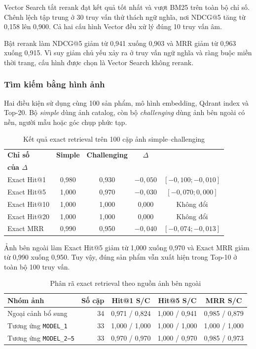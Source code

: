 Vector Search tắt rerank đạt kết quả tốt nhất và vượt BM25 trên toàn bộ chỉ số. Chênh lệch tập trung ở 30 truy vấn thử thách ngữ nghĩa, nơi NDCG@5 tăng từ 0,158 lên 0,900. Cả hai cấu hình Vector đều xử lý đúng 10 truy vấn âm.

Bật rerank làm NDCG@5 giảm từ 0,941 xuống 0,903 và MRR giảm từ 0,963 xuống 0,915. Vì suy giảm chủ yếu xảy ra ở truy vấn ngữ nghĩa và ràng buộc miền thời trang, cấu hình được chọn là Vector Search không rerank.

\subsubsection{Tìm kiếm bằng hình ảnh}

Hai điều kiện sử dụng cùng 100 sản phẩm, mô hình embedding, Qdrant index và Top-20. Bộ \textit{simple} dùng ảnh catalog, còn bộ \textit{challenging} dùng ảnh bên ngoài có nền, người mẫu hoặc góc chụp phức tạp.
\begin{table}[H]
\centering
\caption{Kết quả exact retrieval trên 100 cặp ảnh simple--challenging}
\label{tab:image-paired-exact-results}
\small
\begin{tabularx}{\linewidth}{|X|c|c|c|c|}
\hline
\textbf{Chỉ số} & \textbf{Simple} & \textbf{Challenging} & \textbf{$\Delta$} & \makecell{\textbf{CI 95\%}\\\textbf{của $\Delta$}} \\ \hline
Exact Hit@1 & 0,980 & 0,930 & $-0{,}050$ & $[-0{,}100; -0{,}010]$ \\ \hline
Exact Hit@5 & 1,000 & 0,970 & $-0{,}030$ & $[-0{,}070; 0{,}000]$ \\ \hline
Exact Hit@10 & 1,000 & 1,000 & 0,000 & Không đổi \\ \hline
Exact Hit@20 & 1,000 & 1,000 & 0,000 & Không đổi \\ \hline
Exact MRR & 0,990 & 0,950 & $-0{,}040$ & $[-0{,}074; -0{,}013]$ \\ \hline
\end{tabularx}
\end{table}

Ảnh bên ngoài làm Exact Hit@5 giảm từ 1,000 xuống 0,970 và Exact MRR giảm từ 0,990 xuống 0,950. Tuy vậy, đúng sản phẩm vẫn xuất hiện trong Top-10 ở toàn bộ 100 truy vấn.
\begin{table}[H]
\centering
\caption{Phân rã exact retrieval theo nguồn ảnh bên ngoài}
\label{tab:image-paired-breakdown}
\small
\begin{tabularx}{\linewidth}{|X|r|c|c|c|}
\hline
\textbf{Nhóm ảnh} & \textbf{Số cặp} & \textbf{Hit@1 S/C} & \textbf{Hit@5 S/C} & \textbf{MRR S/C} \\ \hline
Ngoại cảnh bổ sung & 34 & 0,971 / 0,824 & 1,000 / 0,941 & 0,985 / 0,879 \\ \hline
Tương ứng \texttt{MODEL\_1} & 33 & 1,000 / 1,000 & 1,000 / 1,000 & 1,000 / 1,000 \\ \hline
Tương ứng \texttt{MODEL\_2--5} & 33 & 0,970 / 0,970 & 1,000 / 0,970 & 0,985 / 0,973 \\ \hline
\end{tabularx}
\end{table}

